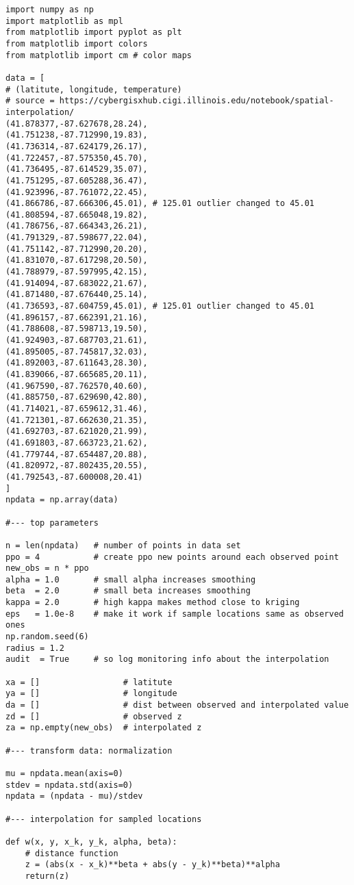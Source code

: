 \documentclass[oneside,10pt]{book}
\begin{document}
\begin{lstlisting}
import numpy as np
import matplotlib as mpl
from matplotlib import pyplot as plt
from matplotlib import colors
from matplotlib import cm # color maps

data = [
# (latitute, longitude, temperature)
# source = https://cybergisxhub.cigi.illinois.edu/notebook/spatial-interpolation/
(41.878377,-87.627678,28.24),
(41.751238,-87.712990,19.83),
(41.736314,-87.624179,26.17),
(41.722457,-87.575350,45.70),
(41.736495,-87.614529,35.07),
(41.751295,-87.605288,36.47),
(41.923996,-87.761072,22.45),
(41.866786,-87.666306,45.01), # 125.01 outlier changed to 45.01
(41.808594,-87.665048,19.82),
(41.786756,-87.664343,26.21),
(41.791329,-87.598677,22.04),
(41.751142,-87.712990,20.20),
(41.831070,-87.617298,20.50),
(41.788979,-87.597995,42.15),
(41.914094,-87.683022,21.67),
(41.871480,-87.676440,25.14),
(41.736593,-87.604759,45.01), # 125.01 outlier changed to 45.01
(41.896157,-87.662391,21.16),
(41.788608,-87.598713,19.50),
(41.924903,-87.687703,21.61),
(41.895005,-87.745817,32.03),
(41.892003,-87.611643,28.30),
(41.839066,-87.665685,20.11),
(41.967590,-87.762570,40.60),
(41.885750,-87.629690,42.80),
(41.714021,-87.659612,31.46),
(41.721301,-87.662630,21.35),
(41.692703,-87.621020,21.99),
(41.691803,-87.663723,21.62),
(41.779744,-87.654487,20.88),
(41.820972,-87.802435,20.55),
(41.792543,-87.600008,20.41)
]
npdata = np.array(data)

#--- top parameters

n = len(npdata)   # number of points in data set
ppo = 4           # create ppo new points around each observed point
new_obs = n * ppo
alpha = 1.0       # small alpha increases smoothing
beta  = 2.0       # small beta increases smoothing
kappa = 2.0       # high kappa makes method close to kriging
eps   = 1.0e-8    # make it work if sample locations same as observed ones
np.random.seed(6)
radius = 1.2
audit  = True     # so log monitoring info about the interpolation

xa = []                 # latitute
ya = []                 # longitude
da = []                 # dist between observed and interpolated value
zd = []                 # observed z
za = np.empty(new_obs)  # interpolated z

#--- transform data: normalization

mu = npdata.mean(axis=0)
stdev = npdata.std(axis=0)
npdata = (npdata - mu)/stdev

#--- interpolation for sampled locations

def w(x, y, x_k, y_k, alpha, beta):
    # distance function
    z = (abs(x - x_k)**beta + abs(y - y_k)**beta)**alpha
    return(z)


\end{lstlisting}
\end{document}
